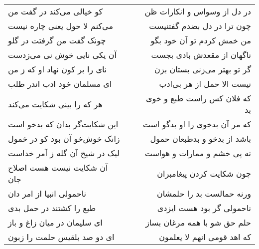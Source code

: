 \begin{center}
\begin{longtable}{l p{0.5cm} r}
کو خیالی می‌کند در گفت من
&&
در دل از وسواس و انکارات ظن
\\
می‌کنم لا حول یعنی چاره نیست
&&
چون ترا در دل بضدم گفتنیست
\\
چونک گفت من گرفتت در گلو
&&
من خمش کردم تو آن خود بگو
\\
آن یکی نایی خوش نی می‌زدست
&&
ناگهان از مقعدش بادی بجست
\\
نای را بر کون نهاد او که ز من
&&
گر تو بهتر می‌زنی بستان بزن
\\
ای مسلمان خود ادب اندر طلب
&&
نیست الا حمل از هر بی‌ادب
\\
هر که را بینی شکایت می‌کند
&&
که فلان کس راست طبع و خوی بد
\\
این شکایت‌گر بدان که بدخو است
&&
که مر آن بدخوی را او بدگو است
\\
زانک خوش‌خو آن بود کو در خمول
&&
باشد از بدخو و بدطبعان حمول
\\
لیک در شیخ آن گله ز آمر خداست
&&
نه پی خشم و ممارات و هواست
\\
آن شکایت نیست هست اصلاح جان
&&
چون شکایت کردن پیغامبران
\\
ناحمولی انبیا از امر دان
&&
ورنه حمالست بد را حلمشان
\\
طبع را کشتند در حمل بدی
&&
ناحمولی گر بود هست ایزدی
\\
ای سلیمان در میان زاغ و باز
&&
حلم حق شو با همه مرغان بساز
\\
ای دو صد بلقیس حلمت را زبون
&&
که اهد قومی انهم لا یعلمون
\\
\end{longtable}
\end{center}
